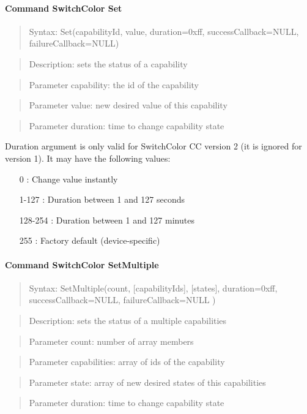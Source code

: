 \paragraph {Command SwitchColor Set}
\begin{quote} Syntax: Set(capabilityId, value, duration=0xff, successCallback=NULL, failureCallback=NULL)\end{quote}
\begin{quote} Description: sets the status of a capability\end{quote}
\begin{quote} Parameter capability: the id of the capability\end{quote}
\begin{quote} Parameter value: new desired value of this capability\end{quote}
\begin{quote} Parameter duration: time to change capability state\end{quote}

Duration argument is only valid for SwitchColor CC version 2 (it is ignored for version 1). 
It may have the following values:
\begin{itemize}
\item [0]: Change value instantly
\item [1-127]: Duration between 1 and 127 seconds
\item [128-254]: Duration between 1 and 127 minutes
\item [255]: Factory default (device-specific)
\end{itemize}

\paragraph {Command SwitchColor SetMultiple}
\begin{quote} Syntax: SetMultiple(count, [capabilityIds], [states], duration=0xff, successCallback=NULL, failureCallback=NULL )\end{quote}
\begin{quote} Description: sets the status of a multiple capabilities\end{quote}
\begin{quote} Parameter count: number of array members\end{quote}
\begin{quote} Parameter capabilities: array of ids of the capability\end{quote}
\begin{quote} Parameter state: array of new desired states of this capabilities\end{quote}
\begin{quote} Parameter duration: time to change capability state\end{quote}

